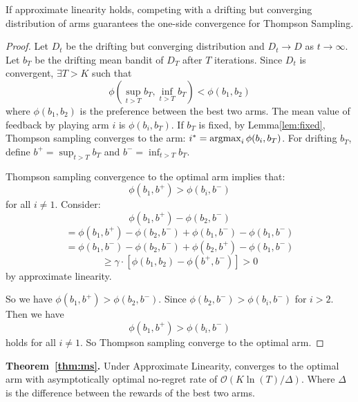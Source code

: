 \begin{cor}
\label{cor:conv}
If approximate linearity holds, competing with a drifting but converging distribution of arms guarantees the one-side convergence for Thompson Sampling.
\end{cor}

\begin{proof}
Let $D_t$ be the drifting but converging distribution and $D_t \rightarrow D$ as $t \rightarrow \infty$. Let $b_T$ be the drifting mean bandit of $D_T$ after $T$ iterations. Since $D_t$ is convergent, $\exists T > K$ such that 
$$\phi(\sup_{t > T} b_T,  \inf_{t > T} b_T) < \phi(b_1, b_2)$$
where $\phi(b_1, b_2)$ is the preference between the best two arms. 
The mean value of feedback by playing arm $i$ is $\phi(b_i, b_T)$. If $b_T$ is fixed, by Lemma\ref{lem:fixed}, Thompson sampling converges to the arm:
$i^* = \argmax_i \phi(b_i, b_T)$. For drifting $b_T$, define $b^+ = \sup_{t > T} b_T$ and $b^- = \inf_{t > T} b_T$.

Thompson sampling convergence to the optimal arm implies that:
$$\phi(b_1, b^+) > \phi(b_i, b^-)$$
for all $i \neq 1$. Consider:
$$\phi(b_1, b^+) - \phi(b_2, b^-)$$
$$ = \phi(b_1, b^+) - \phi(b_2, b^-) + \phi(b_1, b^-) - \phi(b_1, b^-)$$
$$ = \phi(b_1, b^-) - \phi(b_2, b^-) + \phi(b_2, b^+) - \phi(b_1, b^-)$$
$$ \geq \gamma\cdot[\phi(b_1, b_2) - \phi(b^+, b^-)] > 0$$
by approximate linearity.

So we have $\phi(b_1, b^+) > \phi(b_2, b^-)$. Since $\phi(b_2, b^-) > \phi(b_i, b^-)$ for $i > 2$. Then we have $$\phi(b_1, b^+) > \phi(b_i, b^-)$$
holds for all $i \neq 1$. So Thompson sampling converge to the optimal arm.
\end{proof}


\textbf{Theorem~\ref{thm:ms}.}
Under Approximate Linearity, \multisparring converges to the optimal arm with asymptotically optimal no-regret rate of $\mathcal{O}(K\ln(T)/\Delta)$.
Where $\Delta$ is the difference between the rewards of the best two arms.

